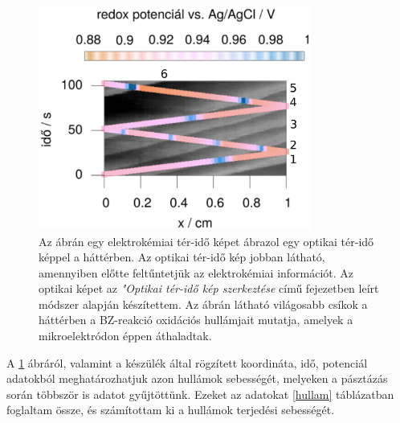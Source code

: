 \begin{figure}
\centering
\includegraphics[width=0.8\textwidth]{img/spacetime2.eps}
\caption{ Az ábrán egy elektrokémiai tér-idő képet ábrazol egy optikai tér-idő képpel a háttérben. Az optikai tér-idő kép jobban látható, amennyiben előtte feltűntetjük az elektrokémiai információt. Az optikai képet az \emph{"Optikai tér-idő kép szerkeztése} című fejezetben leírt módszer alapján készítettem. Az ábrán látható világosabb csíkok a háttérben a BZ-reakció oxidációs hullámjait mutatja, amelyek a mikroelektródon éppen áthaladtak.
}
\label{fig:spatiotemporal}
\end{figure}
A \ref{fig:spatiotemporal} ábráról, valamint a készülék által rögzített koordináta, idő, potenciál adatokból meghatározhatjuk azon hullámok sebességét, melyeken a pásztázás során többször is adatot gyűjtöttünk. Ezeket az adatokat \ref{hullam} táblázatban foglaltam össze, és számítottam ki a hullámok terjedési sebességét.


